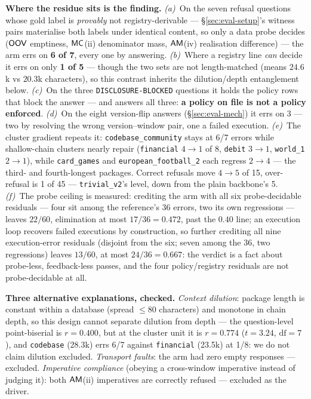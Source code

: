 \smallskip\noindent{}\textbf{Where the residue sits is the finding.}
\emph{(a)}~On the seven refusal questions whose gold label is
\emph{provably} not registry-derivable --- \S\ref{sec:eval-setup}'s witness
pairs materialise both labels under identical content, so only a data probe
decides ($\mathsf{OOV}$ emptiness, $\mathsf{MC}$(ii) denominator mass, $\mathsf{AM}$(iv) realisation
difference) --- the arm errs on \textbf{6 of 7}, every one by answering.
\emph{(b)}~Where a registry line \emph{can} decide it errs on only \textbf{1 of
5} --- though
the two sets are not length-matched (means $24.6$k vs $20.3$k characters), so
this contrast inherits the dilution/depth entanglement below.
\emph{(c)}~On the three \texttt{DISCLOSURE-BLOCKED} questions it holds the
policy rows that block the answer --- and answers all three: \textbf{a
policy on file is not a policy enforced}. \emph{(d)}~On the eight
version-flip answers (\S\ref{sec:eval-mech}) it errs on 3 --- two by
resolving the wrong version--window pair, one a failed execution.
\emph{(e)}~The cluster gradient repeats it:
\texttt{codebase\_community} stays at 6/7 errors while shallow-chain clusters
nearly repair (\texttt{financial} $4\to1$ of 8, \texttt{debit} $3\to1$,
\texttt{world\_1} $2\to1$), while \texttt{card\_games} and
\texttt{european\_football\_2} each regress $2\to4$ --- the third- and
fourth-longest packages. Correct refusals move $4\to5$ of 15, over-refusal
is 1 of 45 --- \texttt{trivial\_v2}'s level, down from the plain backbone's
5. \emph{(f)}~The probe ceiling is measured:
crediting the arm with all six probe-decidable residuals --- four sit
among the reference's 36 errors, two its own regressions --- leaves
$22/60$, elimination at most $17/36=0.472$, past the $0.40$ line; an
execution loop recovers failed executions by construction, so
further crediting all nine execution-error residuals (disjoint from
the six; seven among the 36, two regressions) leaves $13/60$, at most
$24/36=0.667$: the verdict is a fact about probe-less, feedback-less
passes, and the four policy/registry
residuals are not probe-decidable at all.

\smallskip\noindent{}\textbf{Three alternative explanations, checked.}
\emph{Context dilution}: package length is constant within a database
(spread ${\leq}80$ characters) and monotone in chain depth, so this design
cannot separate dilution from depth --- the question-level point-biserial is
$r=0.400$, but at the cluster unit it is $r=0.774$ ($t=3.24$,
$\mathrm{df}=7$), and \texttt{codebase} (28.3k) errs 6/7 against
\texttt{financial} (23.5k) at 1/8: we do not claim dilution excluded. \emph{Transport faults}: the arm had zero empty responses
--- excluded. \emph{Imperative compliance} (obeying a cross-window
imperative instead of judging it): both $\mathsf{AM}$(ii) imperatives are correctly
refused --- excluded as the driver.

